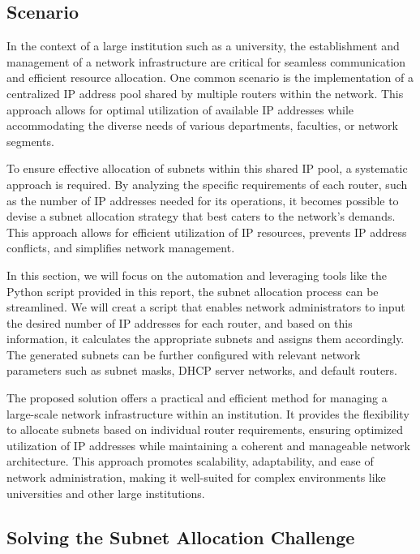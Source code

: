 \subsection{Scenario}

In the context of a large institution such as a university, the establishment and management of a network infrastructure are critical for seamless communication and efficient resource allocation. One common scenario is the implementation of a centralized IP address pool shared by multiple routers within the network. This approach allows for optimal utilization of available IP addresses while accommodating the diverse needs of various departments, faculties, or network segments.

To ensure effective allocation of subnets within this shared IP pool, a systematic approach is required. By analyzing the specific requirements of each router, such as the number of IP addresses needed for its operations, it becomes possible to devise a subnet allocation strategy that best caters to the network's demands. This approach allows for efficient utilization of IP resources, prevents IP address conflicts, and simplifies network management.

In this section, we will focus on the automation and leveraging tools like the Python script provided in this report, the subnet allocation process can be streamlined. We will creat a script that enables network administrators to input the desired number of IP addresses for each router, and based on this information, it calculates the appropriate subnets and assigns them accordingly. The generated subnets can be further configured with relevant network parameters such as subnet masks, DHCP server networks, and default routers.

The proposed solution offers a practical and efficient method for managing a large-scale network infrastructure within an institution. It provides the flexibility to allocate subnets based on individual router requirements, ensuring optimized utilization of IP addresses while maintaining a coherent and manageable network architecture. This approach promotes scalability, adaptability, and ease of network administration, making it well-suited for complex environments like universities and other large institutions.

\subsection{Solving the Subnet Allocation Challenge}

